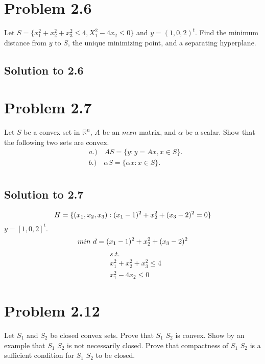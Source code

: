 \documentclass[12pt]{article}
\begin{document}
\section{Problem 2.6}
Let $S = \{ x_1^2 + x_2^2 + x_3^2 \leq 4 , X_1^2 - 4x_2 \leq 0 \}$ and $y = (1, 0 , 2)^t$. Find the minimum distance from $y$ to $S$, the unique minimizing point, and a separating hyperplane.\\

\subsection{Solution to 2.6}
        
\section{Problem 2.7}
Let $S$ be a convex set in $\mathbb{R}^n$, $A$ be an $m x n$ matrix, and $\alpha$ be a scalar. Show that the following two sets are convex.\\
    \begin{align*}
            &a.) \quad AS = \{ y: y = Ax, x\in {S}\}.\\
            &b.) \quad \alpha S = \{ \alpha x: x \in {S} \}.\\
    \end{align*}
\subsection{Solution to 2.7}
    \begin{equation*}
        H = \{ (x_1, x_2, x_3): (x_1 -1)^2 + x_2^2 + (x_3-2)^2 =0 \}\\
    \end{equation*}
     $y = [1,0,2]^t$. 
    \\
    \begin{equation*}
        min \text{ } d = (x_1-1)^2 + x_2^2 + (x_3 - 2)^2\\
    \end{equation*}
    \begin{align*}
        &s.t.\\
        &x_1^2 + x_2^2 + x_3^2 \leq 4\\
        &x_1^2 -4x_2 \leq 0
    \end{align*}


\section{Problem 2.12}
Let $S_1$ and $S_2$ be closed convex sets. Prove that $S_1$ \oplus $S_2$ is convex. Show by an example that $S_1$ \oplus $S_2$ is not necessarily closed. Prove that compactness of $S_1$ \oplus $S_2$ is a sufficient condition for $S_1$ \oplus $S_2$ to be closed.\\ 
\end{document}
